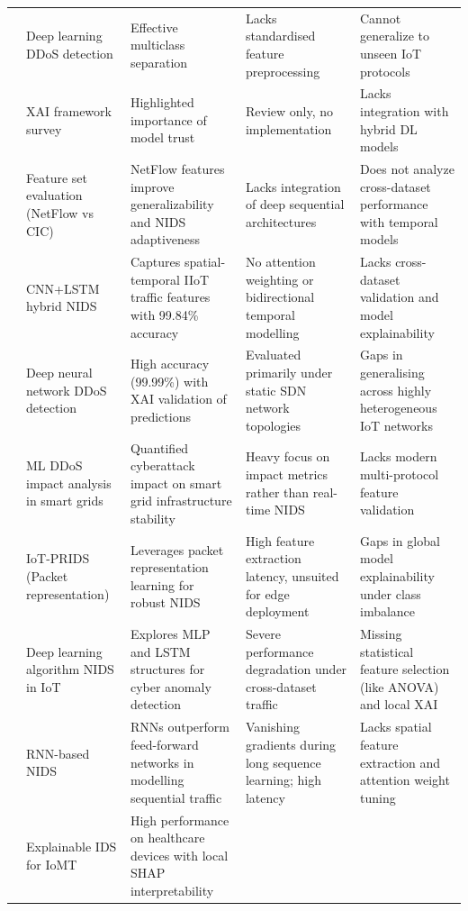 \documentclass[a4paper,fleqn]{cas-sc}
\begin{document}
{\begin{landscape}
\begin{longtable}{p{4cm}p{4cm}p{4cm}p{4cm}p{4cm}}
\cite{basnet2022deep} &
  Deep learning DDoS detection &
  Effective multiclass separation &
  Lacks standardised feature preprocessing &
  Cannot generalize to unseen IoT protocols \\
\cite{almimi2023xai} &
  XAI framework survey &
  Highlighted importance of model trust &
  Review only, no implementation &
  Lacks integration with hybrid DL models \\
\cite{sarhan2020evaluation} &
  Feature set evaluation (NetFlow vs CIC) &
  NetFlow features improve generalizability and NIDS adaptiveness &
  Lacks integration of deep sequential architectures &
  Does not analyze cross-dataset performance with temporal models \\
\cite{yan2023deep} &
  CNN+LSTM hybrid NIDS &
  Captures spatial-temporal IIoT traffic features with 99.84\% accuracy &
  No attention weighting or bidirectional temporal modelling &
  Lacks cross-dataset validation and model explainability \\
\cite{hnamte2024iot} &
  Deep neural network DDoS detection &
  High accuracy (99.99\%) with XAI validation of predictions &
  Evaluated primarily under static SDN network topologies &
  Gaps in generalising across highly heterogeneous IoT networks \\
\cite{sgouras2022detecting} &
  ML DDoS impact analysis in smart grids &
  Quantified cyberattack impact on smart grid infrastructure stability &
  Heavy focus on impact metrics rather than real-time NIDS &
  Lacks modern multi-protocol feature validation \\
\cite{hosseini2024attention} &
  IoT-PRIDS (Packet representation) &
  Leverages packet representation learning for robust NIDS &
  High feature extraction latency, unsuited for edge deployment &
  Gaps in global model explainability under class imbalance \\
\cite{susilo2020security} &
  Deep learning algorithm NIDS in IoT &
  Explores MLP and LSTM structures for cyber anomaly detection &
  Severe performance degradation under cross-dataset traffic &
  Missing statistical feature selection (like ANOVA) and local XAI \\
\cite{yin2020deep} &
  RNN-based NIDS &
  RNNs outperform feed-forward networks in modelling sequential traffic &
  Vanishing gradients during long sequence learning; high latency &
  Lacks spatial feature extraction and attention weight tuning \\
\cite{shaaban2023biomt} &
  Explainable IDS for IoMT &
  High performance on healthcare devices with local SHAP interpretability &

\end{longtable}
\end{landscape}}
\end{document}
